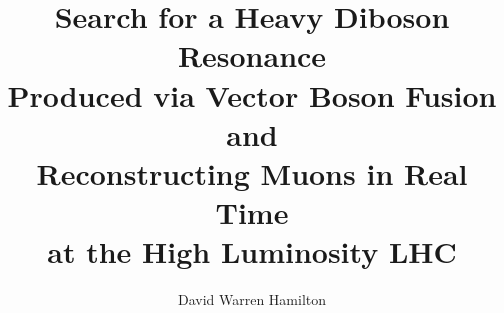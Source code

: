 \documentclass[PhD]{uclathes}
\title{
Search for a Heavy Diboson Resonance\\
Produced via Vector Boson Fusion\\
and\\
Reconstructing Muons in Real Time\\
at the High Luminosity LHC
}
\author{David Warren Hamilton}
\begin{document}
\makeintropages













\appendix




%
\end{document}
